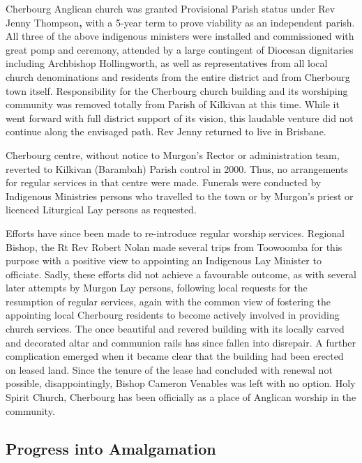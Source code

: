 Cherbourg Anglican church was granted Provisional Parish status under Rev Jenny Thompson\textbf{,} with a 5-year term to prove viability as an independent parish. All three of the above indigenous ministers were installed and commissioned with great pomp and ceremony, attended by a large contingent of Diocesan dignitaries including Archbishop Hollingworth, as well as representatives from all local church denominations and residents from the entire district and from Cherbourg town itself. Responsibility for the Cherbourg church building and its worshiping community was removed totally from Parish of Kilkivan at this time. While it went forward with full district support of its vision, this laudable venture did not continue along the envisaged path. Rev Jenny returned to live in Brisbane.



Cherbourg centre, without notice to Murgon's Rector or administration team, reverted to Kilkivan (Barambah) Parish control in 2000. Thus, no arrangements for regular services in that centre were made. Funerals were conducted by Indigenous Ministries persons who travelled to the town or by Murgon's priest or licenced Liturgical Lay persons as requested.



Efforts have since been made to re-introduce regular worship services. Regional Bishop, the Rt Rev Robert Nolan made several trips from Toowoomba for this purpose with a positive view to appointing an Indigenous Lay Minister to officiate. Sadly, these efforts did not achieve a favourable outcome, as with several later attempts by Murgon Lay persons, following local requests for the resumption of regular services, again with the common view of fostering the appointing local Cherbourg residents to become actively involved in providing church services. The once beautiful and revered building with its locally carved and decorated altar and communion rails has since fallen into disrepair. A further complication emerged when it became clear that the building had been erected on leased land. Since the tenure of the lease had concluded with renewal not possible, disappointingly, Bishop Cameron Venables was left with no option. Holy Spirit Church, Cherbourg has been officially as a place of Anglican worship in the community.



\subsection{Progress into Amalgamation}



